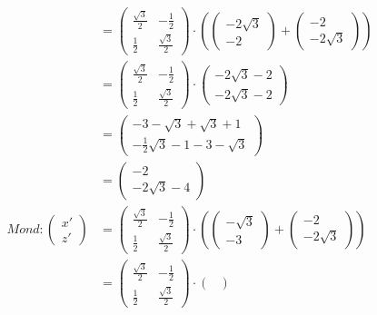 \documentclass[a4paper,10pt,DIV=14]{scrartcl}
\begin{document}
\begin{align*}
&= 
\begin{pmatrix} 
\frac{\sqrt{3}}{2} & -\frac{1}{2} \\
\frac{1}{2} & \frac{\sqrt{3}}{2}
\end{pmatrix} 
\cdot 
\left(
\begin{pmatrix} 
-2\sqrt{3} \\ -2 
\end{pmatrix} + 
\begin{pmatrix}
-2 \\ -2\sqrt{3}
\end{pmatrix}\right) \\
&= 
\begin{pmatrix} 
\frac{\sqrt{3}}{2} & -\frac{1}{2} \\
\frac{1}{2} & \frac{\sqrt{3}}{2}
\end{pmatrix} 
\cdot 
\begin{pmatrix}
-2\sqrt{3} - 2 \\ -2\sqrt{3} -2
\end{pmatrix} \\
&=
\begin{pmatrix}
-3 - \sqrt{3} + \sqrt{3} +1 \\
-\frac{1}{2}\sqrt{3} - 1 -3 - \sqrt{3}
\end{pmatrix} \\
&=
\begin{pmatrix}
- 2 \\ -2\sqrt{3} - 4
\end{pmatrix} \\
Mond: \begin{pmatrix} x' \\ z' \end{pmatrix} 
&= 
\begin{pmatrix} 
\frac{\sqrt{3}}{2} & -\frac{1}{2} \\
\frac{1}{2} & \frac{\sqrt{3}}{2}
\end{pmatrix} 
\cdot 
\left(
\begin{pmatrix} 
-\sqrt{3} \\ -3 
\end{pmatrix} + 
\begin{pmatrix}
-2 \\ -2\sqrt{3}
\end{pmatrix}\right) \\
&= 
\begin{pmatrix} 
\frac{\sqrt{3}}{2} & -\frac{1}{2} \\
\frac{1}{2} & \frac{\sqrt{3}}{2}
\end{pmatrix} 
\cdot 
\begin{pmatrix}

\end{pmatrix}
\end{align*}
\end{document}
